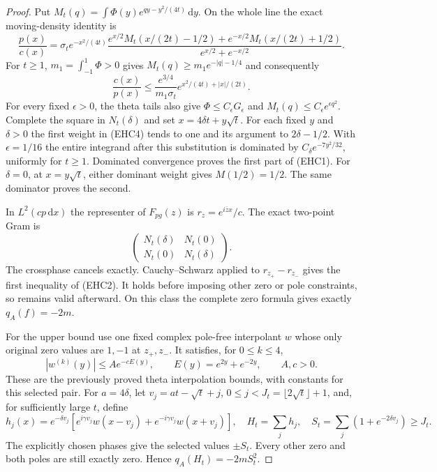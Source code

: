 \documentclass[11pt]{article}
\theoremstyle{remark}\newtheorem{remark}[theorem]{Remark}
\newcommand{\dd}{\,\mathrm d}
\begin{document}
\begin{proof}
Put $M_t(q)=\int\Phi(y)e^{qy-y^2/(4t)}\dd y$.
On the whole line the exact moving-density identity is
\[
 \frac{p(x)}{c(x)}=\sigma_t e^{-x^2/(4t)}
 \frac{e^{x/2}M_t(x/(2t)-1/2)+
       e^{-x/2}M_t(x/(2t)+1/2)}
                  {e^{x/2}+e^{-x/2}}.              \tag{EHC4}
\]
For $t\ge1$, $m_1=\int_{-1}^1\Phi>0$ gives
$M_t(q)\ge m_1e^{-|q|-1/4}$ and consequently
\[
 \frac{c(x)}{p(x)}\le
       \frac{e^{3/4}}{m_1\sigma_t}
                         e^{x^2/(4t)+|x|/(2t)}.    \tag{EHC5}
\]
For every fixed $\epsilon>0$, the theta tails also give
$\Phi\le C_\epsilon G_\epsilon$ and
$M_t(q)\le C_\epsilon e^{\epsilon q^2}$.
Complete the square in $N_t(\delta)$ and set
$x=4\delta t+y\sqrt t$. For each fixed $y$ and $\delta>0$
the first weight in (EHC4) tends to one and its argument
to $2\delta-1/2$. With $\epsilon=1/16$ the entire integrand
after this substitution is dominated by
$C_\delta e^{-7y^2/32}$, uniformly for $t\ge1$.
Dominated convergence proves the first part of (EHC1).
For $\delta=0$, at $x=y\sqrt t$, either dominant weight
gives $M(1/2)=1/2$. The same dominator proves the second.

In $L^2(cp\dd x)$ the representer of $F_{pg}(z)$ is
$r_z=e^{i\bar z x}/c$. The exact two-point Gram is
\[
 \begin{pmatrix}N_t(\delta)&N_t(0)\\
                 N_t(0)&N_t(\delta)\end{pmatrix}.
\]
The crossphase cancels exactly. Cauchy--Schwarz applied
to $r_{z_+}-r_{z_-}$ gives the first inequality of (EHC2).
It holds before imposing other zero or pole constraints,
so remains valid afterward. On this class the complete
zero formula gives exactly $q_A(f)=-2m$.

For the upper bound use one fixed complex pole-free interpolant
$w$ whose only original zero values are $1,-1$ at $z_+,z_-$.
It satisfies, for $0\le k\le4$,
\[
 |w^{(k)}(y)|\le A e^{-cE(y)},\qquad
 E(y)=e^{2y}+e^{-2y},\qquad A,c>0.                 \tag{EHC6}
\]
These are the previously proved theta interpolation bounds,
with constants for this selected pair.
For $a=4\delta$, let
$v_j=at-\sqrt t+j$, $0\le j<J_t=\lfloor2\sqrt t\rfloor+1$,
and, for sufficiently large $t$, define
\[
 h_j(x)=e^{-\delta v_j}
       [e^{i\gamma v_j}w(x-v_j)+
        e^{-i\gamma v_j}w(x+v_j)],\quad
 H_t=\sum_jh_j,\quad
 S_t=\sum_j(1+e^{-2\delta v_j})\ge J_t.             \tag{EHC7}
\]
The explicitly chosen phases give the selected values
$\pm S_t$. Every other zero and both poles are still exactly
zero. Hence $q_A(H_t)=-2mS_t^2$.


\end{proof}
\end{document}
